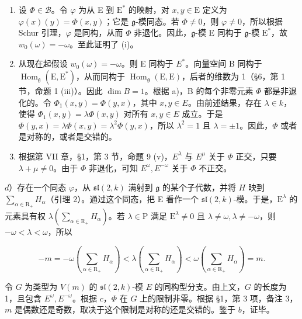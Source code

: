 \begin{enumerate}
\def\labelenumi{\alph{enumi})}
\item
  设 \(\Phi \in \mathcal{B}\)。令 \(\varphi\) 为从 E 到 \(\mathrm{E}^*\) 的映射，对 \(x, y \in \mathrm{E}\) 定义为 \(\varphi(x)(y) = \Phi(x, y)\)；它是 \(\mathfrak{g}\)-模同态。若 \(\Phi \neq 0\)，则 \(\varphi \neq 0\)，所以根据 Schur 引理，\(\varphi\) 是同构，从而 \(\Phi\) 非退化。因此，\(\mathfrak{g}\)-模 E 同构于 \(\mathfrak{g}\)-模 \(\mathrm{E}^*\)，故 \(w_0(\omega) = -\omega\)。至此证明了 (i)。
\item
  从现在起假设 \(w_{0}(\omega) = -\omega\)。则 E 同构于 \(E^{*}\)。向量空间 B 同构于 \(\operatorname{Hom}_{\mathfrak{g}}(\mathrm{E}, \mathrm{E}^{*})\)，从而同构于 \(\operatorname{Hom}_{\mathfrak{g}}(\mathrm{E}, \mathrm{E})\)，后者的维数为 1（§6，第 1 节，命题 1 (iii)）。因此 \(\dim B = 1\)。根据 a)，B 的每个非零元素 \(\Phi\) 都是非退化的。令 \(\Phi_{1}(x, y) = \Phi(y, x)\)，其中 \(x, y \in E\)。由前述结果，存在 \(\lambda \in k\)，使得 \(\Phi_{1}(x, y) = \lambda \Phi(x, y)\) 对所有 \(x, y \in E\) 成立。于是 \(\Phi(y, x) = \lambda \Phi(x, y) = \lambda^{2} \Phi(y, x)\)，所以 \(\lambda^{2} = 1\) 且 \(\lambda = \pm 1\)。因此，\(\Phi\) 或者是对称的，或者是交错的。
\item
根据第 VII 章，§1，第 3 节，命题 9 (v)，\(E^{\lambda}\) 与 \(E^{\mu}\) 关于 \(\Phi\) 正交，只要 \(\lambda + \mu \neq 0\)。由于 \(\Phi\) 非退化，可知 \(E^{\omega}, E^{-\omega}\) 关于 \(\Phi\) 不正交。
\end{enumerate}

\(d\)）存在一个同态 \(\varphi\)，从 \(\mathfrak{sl}(2,k)\) 满射到 \(\mathfrak{g}\) 的某个子代数，并将 \(H\) 映到 \(\sum_{\alpha \in \mathrm{R}_{+}}H_{\alpha}\)（引理 2）。通过这个同态，把 E 看作一个 \(\mathfrak{sl}(2,k)\)-模。于是，\(\mathrm{E}^{\lambda}\) 的元素具有权 \(\lambda \left(\sum_{\alpha \in \mathrm{R}_{+}}H_\alpha\right)\)。若 \(\lambda \in \mathrm{P}\) 满足 \(\mathrm{E}^{\lambda} \neq 0\) 且 \(\lambda \neq \omega, \lambda \neq -\omega\)，则 \(-\omega < \lambda < \omega\)，所以

\[
- m = - \omega \left(\sum_ {\alpha \in \mathrm{R} _ {+}} H _ {\alpha}\right) <   \lambda \left(\sum_ {\alpha \in \mathrm{R} _ {+}} H _ {\alpha}\right) <   \omega \left(\sum_ {\alpha \in \mathrm{R} _ {+}} H _ {\alpha}\right) = m.
\]

令 \(G\) 为类型为 \(V(m)\) 的 \(\mathfrak{sl}(2, k)\)-模 \(E\) 的同构型分支。由上文，\(G\) 的长度为 1，且包含 \(E^{\omega}, E^{-\omega}\)。根据 \(c\)，\(\Phi\) 在 \(G\) 上的限制非零。根据 §1，第 3 项，备注 3，\(m\) 是偶数还是奇数，取决于这个限制是对称的还是交错的。鉴于 \(b\)，证毕。

